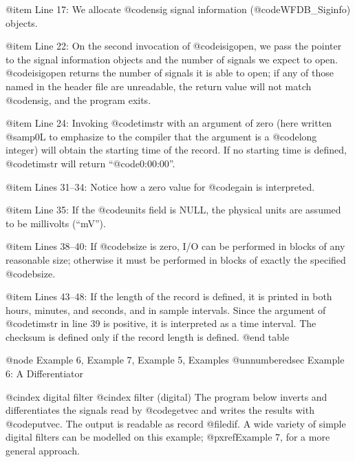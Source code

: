 {{{{{{{{{@item Line 17:
We allocate @code{nsig} signal information (@code{WFDB_Siginfo}) objects.

@item Line 22:
On the second invocation of @code{isigopen}, we pass the pointer to the
signal information objects and the number of signals we expect to open.
@code{isigopen} returns the number of signals it is able to open;  if
any of those named in the header file are unreadable, the return value
will not match @code{nsig}, and the program exits.

@item Line 24:
Invoking @code{timstr} with an argument of zero (here written @samp{0L}
to emphasize to the compiler that the argument is a @code{long} integer)
will obtain the starting time of the record.  If no starting time is
defined, @code{timstr} will return ``@code{0:00:00}''.

@item Lines 31--34:
Notice how a zero value for @code{gain} is interpreted.

@item Line 35:
If the @code{units} field is NULL, the physical units are assumed to be
millivolts (``mV'').

@item Lines 38--40:
If @code{bsize} is zero, I/O can be performed in blocks of any reasonable
size;  otherwise it must be performed in blocks of exactly the specified
@code{bsize}.

@item Lines 43--48:
If the length of the record is defined, it is printed in both hours,
minutes, and seconds, and in sample intervals.  Since the argument of
@code{timstr} in line 39 is positive, it is interpreted as a time
interval.  The checksum is defined only if the record length is
defined.
@end table

@node     Example 6, Example 7, Example 5, Examples
@unnumberedsec Example 6: A Differentiator

@cindex digital filter
@cindex filter (digital)
The program below inverts and differentiates the signals read by
@code{getvec} and writes the results with @code{putvec}.  The output is
readable as record @file{dif}.  A wide variety of simple digital filters
can be modelled on this example; @pxref{Example 7}, for a more general
approach.

}}}}}}}}}
